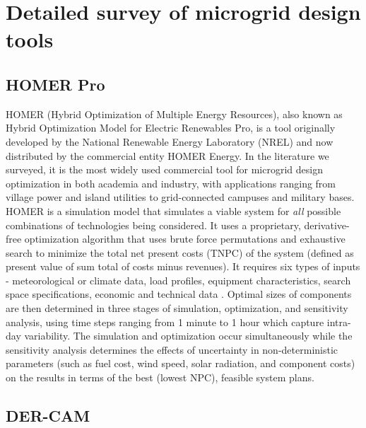 \documentclass[final,3p,times]{elsarticle}
\begin{document}

\section{Detailed survey of microgrid design tools \label{app:tools}}

\subsection{HOMER Pro}

HOMER (Hybrid Optimization of Multiple Energy Resources), also known as Hybrid Optimization Model for Electric Renewables Pro, is a tool originally developed by the National Renewable Energy Laboratory (NREL) and now distributed by the commercial entity HOMER Energy. In the literature we surveyed, it is the most widely used commercial tool for microgrid design optimization in both academia and industry, with applications ranging from village power and island utilities to grid-connected campuses and military bases. HOMER is a simulation model that simulates a viable system for \textit{all} possible combinations of technologies being considered. It uses a proprietary, derivative-free optimization algorithm that uses brute force permutations and exhaustive search \cite{weng2016} to minimize the total net present costs (TNPC) of the system (defined as present value of sum total of costs minus revenues). It requires six types of inputs - meteorological or climate data, load profiles, equipment characteristics, search space specifications, economic and technical data \cite{bahramara2016}. Optimal sizes of components are then determined in three stages of simulation, optimization, and sensitivity analysis, using time steps ranging from 1 minute to 1 hour which capture intra-day variability. The simulation and optimization occur simultaneously while the sensitivity analysis determines the effects of uncertainty in non-deterministic parameters (such as fuel cost, wind speed, solar radiation, and component costs) on the results in terms of the best (lowest NPC), feasible system plans.

\subsection{DER-CAM}
\end{document}
